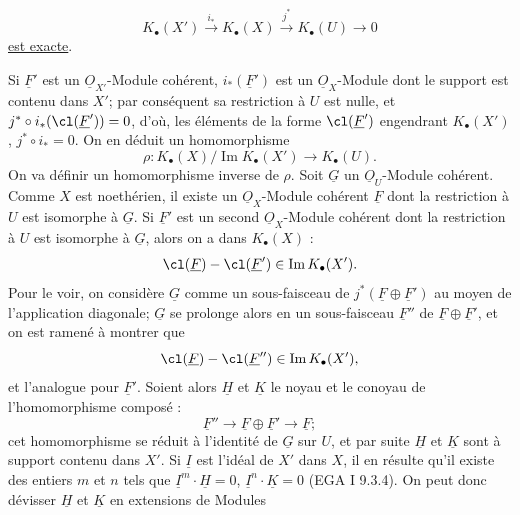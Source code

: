
\[
K_\bullet(X')\xrightarrow{i_*}K_\bullet(X)\xrightarrow{j^*}K_\bullet(U)\longrightarrow 0
\]
\uline{est
exacte}.

Si $\underline{F}'$ est un $\underline{O}_{X'}$-Module cohérent, $i_*(\underline{F}')$ est un $\underline{O}_X$-Module dont le support est contenu dans $X'$; par conséquent sa restriction à $U$ est nulle, et $j^*\circ i_*(\cl(\underline{F}'))=0$, d'où, les éléments de la forme $\cl(\underline{F}')$ engendrant $K_\bullet(X')$, $j^*\circ i_*=0$. On en déduit un homomorphisme
\[
 \rho:K_\bullet(X)/\operatorname{Im}K_\bullet(X')\longrightarrow K_\bullet(U).
\]
On va définir un homomorphisme inverse de $\rho$. Soit $\underline{G}$ un $\underline{O}_U$-Module cohérent. Comme $X$ est noethérien, il existe un $\underline{O}_X$-Module cohérent $\underline{F}$ dont la restriction à $U$ est isomorphe à $\underline{G}$. Si $\underline{F}'$ est un second $\underline{O}_X$-Module cohérent dont la restriction à $U$ est isomorphe à $\underline{G}$, alors on a dans $K_\bullet(X)$ :
\[
 \cl(\underline{F})-\cl(\underline{F}')\in \operatorname{Im}K_\bullet(X').
\]
Pour le voir, on considère $\underline{G}$ comme un sous-faisceau de $j^*(\underline{F}\oplus \underline{F}')$ au moyen de l'application diagonale; $\underline{G}$ se prolonge alors en un sous-faisceau $\underline{F}''$ de $\underline{F}\oplus \underline{F}'$, et on est ramené à montrer que
\[
 \cl(\underline{F})-\cl(\underline{F}'')\in \operatorname{Im}K_\bullet(X'),
\]
et l'analogue pour $\underline{F}'$. Soient alors $\underline{H}$ et $\underline{K}$ le noyau et le conoyau de l'homomorphisme composé :
\[
\underline{F}''\longrightarrow \underline{F}\oplus \underline{F}'\longrightarrow \underline{F} ;
\]
cet homomorphisme se réduit à l'identité de $\underline{G}$ sur $U$, et par suite $\underline{H}$ et $\underline{K}$ sont à support contenu dans $X'$. Si $\underline{I}$ est l'idéal de $X'$ dans $X$, il en résulte qu'il existe des entiers $m$ et $n$ tels que $\underline{I}^m\cdot \underline{H}=0$, $\underline{I}^n\cdot \underline{K}=0$ (EGA I 9.3.4). On peut donc dévisser $\underline{H}$ et $\underline{K}$ en extensions de Modules
